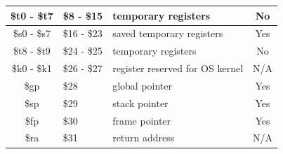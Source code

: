 \documentclass[
  oneside,
  11pt, a4paper,
  footinclude=true,
  headinclude=true,
  cleardoublepage=empty
]{scrbook}
\begin{document}
\begin{table}[h!]
\begin{tabular}{cllc}
\multicolumn{1}{|c|}{\$t0 - \$t7}     & \multicolumn{1}{l|}{\$8 - \$15}        & \multicolumn{1}{l|}{temporary registers}                                                                                                  & \multicolumn{1}{c|}{No}                                                                        \\ \hline
\multicolumn{1}{|c|}{\$s0 - \$s7}     & \multicolumn{1}{l|}{\$16 - \$23}       & \multicolumn{1}{l|}{saved temporary registers}                                                                                            & \multicolumn{1}{c|}{Yes}                                                                       \\ \hline
\multicolumn{1}{|c|}{\$t8 - \$t9}     & \multicolumn{1}{l|}{\$24 - \$25}       & \multicolumn{1}{l|}{temporary registers}                                                                                                  & \multicolumn{1}{c|}{No}                                                                        \\ \hline
\multicolumn{1}{|c|}{\$k0 - \$k1}     & \multicolumn{1}{l|}{\$26 - \$27}       & \multicolumn{1}{l|}{register reserved for OS kernel}                                                                                        & \multicolumn{1}{c|}{N/A}                                                                       \\ \hline
\multicolumn{1}{|c|}{\$gp}          & \multicolumn{1}{l|}{\$28}            & \multicolumn{1}{l|}{global pointer}                                                                                                         & \multicolumn{1}{c|}{Yes}                                                                       \\ \hline
\multicolumn{1}{|c|}{\$sp}          & \multicolumn{1}{l|}{\$29}            & \multicolumn{1}{l|}{stack pointer}                                                                                                          & \multicolumn{1}{c|}{Yes}                                                                       \\ \hline
\multicolumn{1}{|c|}{\$fp}          & \multicolumn{1}{l|}{\$30}            & \multicolumn{1}{l|}{frame pointer}                                                                                                          & \multicolumn{1}{c|}{Yes}                                                                       \\ \hline
\multicolumn{1}{|c|}{\$ra}          & \multicolumn{1}{l|}{\$31}            & \multicolumn{1}{l|}{return address}                                                                                                         & \multicolumn{1}{c|}{N/A}                                                                       \\ \hline

\end{tabular}
\end{table}
\end{document}
